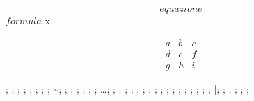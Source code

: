 \begin{equation}
equazione
\label{etichetta}
\end{equation}
\( formula\)
\text  %
{\color{red}x}  %

\[
\begin{matrix}
  a & b & c \\
  d & e & f \\
  g & h & i
\end{matrix}
\]

\pm; \mp; \ll; \gg; \leq; \geq; \equiv; \propto; \sim; \approx; \neq
\diamond; \bigcirc; \bullet; \circ; \cdot; \otimes
\dots; \times; \infty; \forall; \in; \cos; \sin; \lim; \tan; 
\uparrow; \downarrow; \partial; \nabla; 
\boldsymbol{}
\hat{}; \dot{}; \overrightarrow{}; \overline{}; \widehat{}; \tilde{}
\bar{}; \ddot{}; \vec{}; \underline{}
\binom{}{}
\sum; \int; \prod; 


